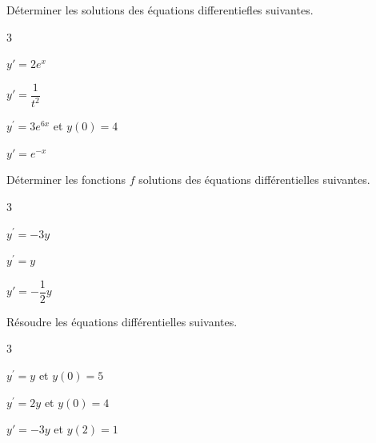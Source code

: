 \documentclass[11pt,a4paper]{article}  %
\begin{document}
	\graphicspath{{images/}}
	
	\begin{center}
		
		
	\end{center}
	
\vspace*{-0.5cm}
\exerciceDS{}

Déterminer les solutions des équations differentiefles suivantes.
\begin{multicols}{3}
	\begin{enumMet}
	\item $y'=2e^x$
	\item $y'=\dfrac{1}{t^2}$
	\item $y^{\prime}=3 e^{6 x}$ et $y(0)=4$
	\item $y'=e^{-x}$
\end{enumMet}
\end{multicols}

\exerciceDS{}

Déterminer les fonctions $f$ solutions des équations différentielles suivantes.
\begin{multicols}{3}
	\begin{enumMet}
	\item $y^{\prime}=-3 y$
	\item $y^{\prime}=y$
	\item $y'=-\dfrac{1}{2} y$
\end{enumMet}
\end{multicols}


Résoudre les équations différentielles suivantes.
\begin{multicols}{3}
	\begin{enumMet}
	\item $y^{\prime}=y$ et $y(0)=5$
	\item $y^{\prime}=2 y$ et $y(0)=4$
	\item $y'=-3 y$ et $y(2)=1$
\end{enumMet}
\end{multicols}
\end{document}

